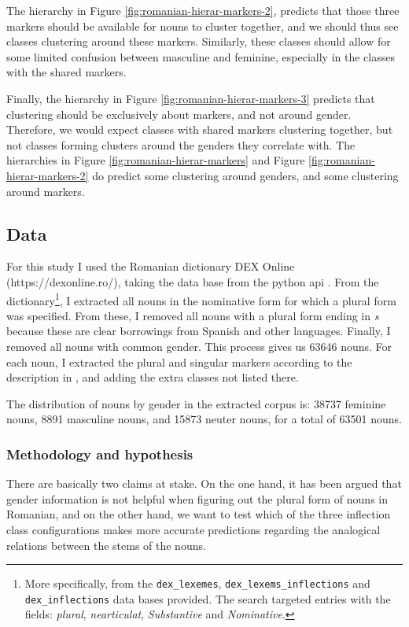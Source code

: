 The hierarchy in Figure \ref{fig:romanian-hierar-markers-2}, predicts that those three markers should be available for nouns to cluster together, and we should thus see classes clustering around these markers. Similarly, these classes should allow for some limited confusion between masculine and feminine, especially in the classes with the shared markers.

Finally, the hierarchy in Figure \ref{fig:romanian-hierar-markers-3} predicts that clustering should be exclusively about markers, and not around gender. Therefore, we would expect classes with shared markers clustering together, but not classes forming clusters around the genders they correlate with. The hierarchies in Figure \ref{fig:romanian-hierar-markers} and Figure \ref{fig:romanian-hierar-markers-2} do predict some clustering around genders, and some clustering around markers.

\subsection{Data}

For this study I used the Romanian dictionary DEX Online (https://dexonline.ro/), taking the data base from the python api \autocite{Navalici.2013}. From the dictionary\footnote{More specifically, from the \texttt{dex\_lexemes}, \texttt{dex\_lexems\_inflections} and \texttt{dex\_inflections} data bases provided. The search targeted entries with the fields: \textit{plural}, \textit{nearticulat}, \textit{Substantive} and \textit{Nominative}.}, I extracted all nouns in the nominative form for which a plural form was specified. From these, I removed all nouns with a plural form ending in \textit{s} because these are clear borrowings from Spanish and other languages. Finally, I removed all nouns with common gender. This process gives us 63646 nouns. For each noun, I extracted the plural and singular markers according to the description in \textcite{Cojocaru.2003}, and adding the extra classes not listed there.

The distribution of nouns by gender in the extracted corpus is: 38737 feminine nouns, 8891 masculine nouns, and 15873 neuter nouns, for a total of 63501 nouns.

\subsubsection{Methodology and hypothesis}

There are basically two claims at stake. On the one hand, it has been argued that gender information is not helpful when figuring out the plural form of nouns in Romanian, and on the other hand, we want to test which of the three inflection class configurations makes more accurate predictions regarding the analogical relations between the stems of the nouns.


